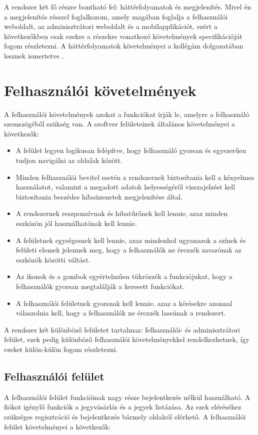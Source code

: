 A rendszer két fő részre bontható fel: háttérfolyamatok és megjelenítés. Mivel én a megjelenítés résszel foglalkozom, amely magában foglalja a felhasználói weboldalt, az adminisztrátori weboldalt és a mobilapplikációt, ezért a következőkben csak ezekre a részekre vonatkozó követelmények specifikációját fogom részletezni. A háttérfolyamatok követelményei a kollégám dolgozatában lesznek ismertetve \cite{bus4userver}.

\section{Felhasználói követelmények}
A felhasználói követelmények azokat a funkciókat írják le, amelyre a felhasználó szemszögéből szükség van. A szoftver felületeinek általános követelményei a következők:

\begin{itemize}
  \item A felület legyen logikusan felépítve, hogy felhasználó gyorsan és egyszerűen tudjon navigálni az oldalak között.
  \item Minden felhasználói bevitel esetén a rendszernek biztosítania kell a kényelmes használatot, valamint a megadott adatok helyességéről visszajelzést kell biztosítania beszédes hibaüzenetek megjelenítése által.
  \item A rendszernek reszponzívnak és hibatűrőnek kell lennie, azaz minden eszközön jól használhatónak kell lennie.
  \item A felületnek egységesnek kell lennie, azaz mindenhol ugyanazok a színek és felületi elemek jelennek meg, hogy a felhasználók ne érezzék zavarónak az eszközök közötti váltást.
  \item Az ikonok és a gombok egyértelműen tükrözzék a funkciójukat, hogy a felhasználók gyorsan megtalálják a keresett funkciókat.
  \item A felhasználói felületnek gyorsnak kell lennie, azaz a kérésekre azonnal válaszolnia kell, hogy a felhasználók ne érezzék lassúnak a rendszert.
\end{itemize}

A rendszer két különböző felületet tartalmaz: felhasználói- és adminisztrátori felület, ezek pedig különböző felhasználói követelményekkel rendelkezhetnek, így ezeket külön-külön fogom részletezni.

\subsection{Felhasználói felület}
A felhasználói felület funkcióinak nagy része bejelentkezés nélkül használható. A fiókot igénylő funkciók a jegyvásárlás és a jegyek listázása. Az ezek eléréséhez szükséges regisztráció és bejelentkezés bármely oldalról elérhető. A felhasználói felület követelményei a következők:


